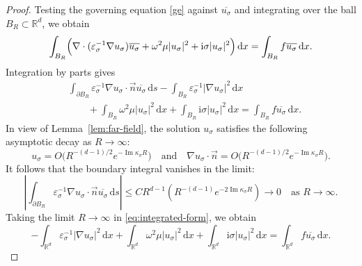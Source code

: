 \documentclass[12pt,reqno]{amsart}
\numberwithin{equation}{section}
\begin{document}
\begin{proof}
Testing the governing equation  \eqref{ge} against $\overline{u_\sigma}$ and integrating over the ball $B_R \subset \mathbb{R}^d$, we obtain
\begin{equation*}
    \int_{B_R} \Bigl(\nabla \cdot (\varepsilon_\sigma^{-1} \nabla u_\sigma)\overline{u_\sigma} + \omega^2 \mu |u_\sigma|^2 + \mathrm{i}\sigma |u_\sigma|^2\Bigr)\,\mathrm{d}x = \int_{B_R} f\overline{u_\sigma}\,\mathrm{d}x.
\end{equation*}
Integration by parts gives
\begin{align}\label{eq:integrated-form}
    &\int_{\partial B_R} \varepsilon_\sigma^{-1}\nabla u_\sigma\cdot\vec{n} \overline{u_\sigma}\,\mathrm{d}s - \int_{B_R} \varepsilon_\sigma^{-1} |\nabla u_\sigma|^2\,\mathrm{d}x  \nonumber\\
    &\qquad + \int_{B_R} \omega^2 \mu |u_\sigma|^2\,\mathrm{d}x + \int_{B_R} \mathrm{i}\sigma |u_\sigma|^2\,\mathrm{d}x = \int_{B_R} f\overline{u_\sigma}\,\mathrm{d}x.
\end{align}
In view of Lemma~\ref{lem:far-field}, the solution $u_\sigma$ satisfies the following asymptotic decay as $R \to \infty$:
\begin{equation*}
    u_\sigma = O\!\bigl(R^{-(d-1)/2}e^{-\operatorname{Im}\kappa_\sigma R}\bigr) \quad \text{and} \quad \nabla u_\sigma \cdot \vec{n} = O\!\bigl(R^{-(d-1)/2}e^{-\operatorname{Im}\kappa_\sigma R}\bigr).
\end{equation*}
It follows that the boundary integral vanishes in the limit:
\begin{equation*}
    \left| \int_{\partial B_R} \varepsilon_\sigma^{-1}\nabla u_\sigma\cdot\vec{n} \overline{u_\sigma}\,\mathrm{d}s \right| \leq C R^{d-1} \left( R^{-(d-1)} e^{-2\operatorname{Im}\kappa_\sigma R} \right) \longrightarrow 0 \quad \text{as } R \to \infty.
\end{equation*}
Taking the limit $R \to \infty$ in \eqref{eq:integrated-form}, we obtain
\begin{equation}\label{eq:limit-equation}
    -\int_{\mathbb{R}^d} \varepsilon_\sigma^{-1} |\nabla u_\sigma|^2\,\mathrm{d}x + \int_{\mathbb{R}^d} \omega^2 \mu |u_\sigma|^2\,\mathrm{d}x + \int_{\mathbb{R}^d} \mathrm{i}\sigma |u_\sigma|^2\,\mathrm{d}x = \int_{\mathbb{R}^d} f\overline{u_\sigma}\,\mathrm{d}x.
\end{equation}


\end{proof}
\end{document}
